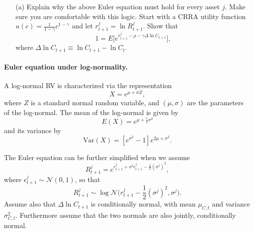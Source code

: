 \documentclass[11pt]{extarticle}
\theoremstyle{plain}
\theoremstyle{definition}
\begin{document}
\begin{enumerate}
\item [(a)] Explain why the above Euler equation must hold for every asset $j$. Make sure you are comfortable with this logic. Start with a CRRA utility function $u(c) = \frac{1}{1-\gamma} c^{1-\gamma}$ and let $r_{t+1}^j = \ln R_{t+1}^j$. Show that
\begin{equation*}
	1 = E\bigg[ e^{r_{t+1}^j - \rho -\gamma \Delta \ln  C_{t+1}} \bigg],
\end{equation*}
where $\Delta \ln C_{t+1} \equiv \ln C_{t+1} - \ln C_t$.
\end{enumerate}


\paragraph{Euler equation under log-normality.} 
A log-normal RV is characterized via the representation
\begin{equation*}
	X = e^{\mu + \sigma Z},
\end{equation*}
where $Z$ is a standard normal random variable, and $(\mu,\sigma)$ are the parameters of the log-normal. The mean of the log-normal is given by
\begin{equation*}
	E(X) = e^{\mu + \frac{1}{2} \sigma^2}
\end{equation*}
and its variance by
\begin{equation*}
	\text{Var}(X) = [e^{\sigma^2}-1] e^{2\mu + \sigma^2}.
\end{equation*}


The Euler equation can be further simplified when we assume
\begin{equation*}
	R_{t+1}^j = e^{r_{t+1}^j + \sigma^j \epsilon_{t+1}^j - \frac{1}{2} (\sigma^j)^2},
\end{equation*}
where $\epsilon_{t+1}^j \sim \mathcal{N}(0,1)$, so that 
\begin{equation*}
	R_{t+1}^j  \sim \log \mathcal{N} \bigg(r_{t+1}^j - \frac{1}{2} (\sigma^j)^2, \sigma^j\bigg).
\end{equation*}
Assume also that $\Delta \ln  C_{t+1}$ is conditionally normal, with mean $\mu_{C,t}$ and variance $\sigma_{C,t}^2$. Furthermore assume that the two normals are also jointly, conditionally normal.
\end{document}
